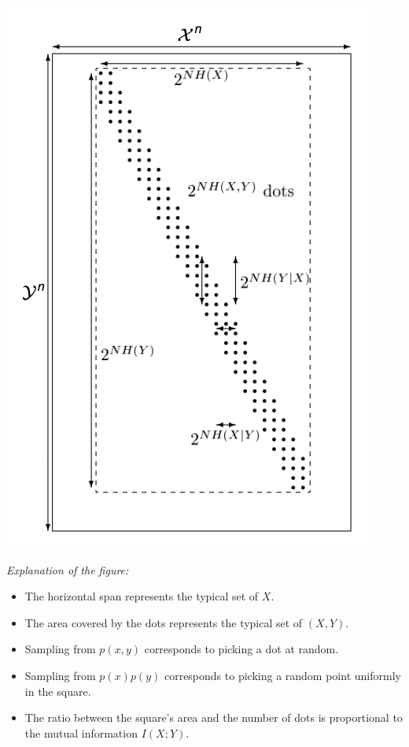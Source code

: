 \begin{center}
\includegraphics[width=\linewidth]{img/joint_dots.png}
\end{center}

\textit{Explanation of the figure:}
\begin{itemize}
    \item The horizontal span represents the typical set of $X$.
    \item The area covered by the dots represents the typical set of $(X, Y)$.
    \item Sampling from $p(x, y)$ corresponds to picking a dot at random.
    \item Sampling from $p(x)p(y)$ corresponds to picking a random point uniformly in the square.
    \item The ratio between the square's area and the number of dots is proportional to the mutual information $I(X; Y)$.
\end{itemize}

